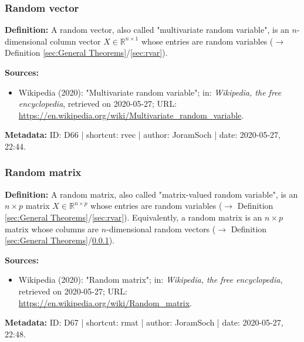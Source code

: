 \documentclass[a4paper,12pt,twoside]{book}
\begin{document}
\subsubsection[\textit{Random vector}]{Random vector} \label{sec:rvec}
\setcounter{equation}{0}

\textbf{Definition:} A random vector, also called "multivariate random variable", is an $n$-dimensional column vector $X \in \mathbb{R}^{n \times 1}$ whose entries are random variables ($\rightarrow$ Definition \ref{sec:General Theorems}/\ref{sec:rvar}).


\vspace{1em}
\textbf{Sources:}
\begin{itemize}
\item Wikipedia (2020): "Multivariate random variable"; in: \textit{Wikipedia, the free encyclopedia}, retrieved on 2020-05-27; URL: \url{https://en.wikipedia.org/wiki/Multivariate_random_variable}.
\end{itemize}


\vspace{1em}
\textbf{Metadata:} ID: D66 | shortcut: rvec | author: JoramSoch | date: 2020-05-27, 22:44.
\vspace{1em}



\subsubsection[\textit{Random matrix}]{Random matrix} \label{sec:rmat}
\setcounter{equation}{0}

\textbf{Definition:} A random matrix, also called "matrix-valued random variable", is an $n \times p$ matrix $X \in \mathbb{R}^{n \times p}$ whose entries are random variables ($\rightarrow$ Definition \ref{sec:General Theorems}/\ref{sec:rvar}). Equivalently, a random matrix is an $n \times p$ matrix whose columns are $n$-dimensional random vectors ($\rightarrow$ Definition \ref{sec:General Theorems}/\ref{sec:rvec}).


\vspace{1em}
\textbf{Sources:}
\begin{itemize}
\item Wikipedia (2020): "Random matrix"; in: \textit{Wikipedia, the free encyclopedia}, retrieved on 2020-05-27; URL: \url{https://en.wikipedia.org/wiki/Random_matrix}.
\end{itemize}


\vspace{1em}
\textbf{Metadata:} ID: D67 | shortcut: rmat | author: JoramSoch | date: 2020-05-27, 22:48.
\vspace{1em}
\end{document}
